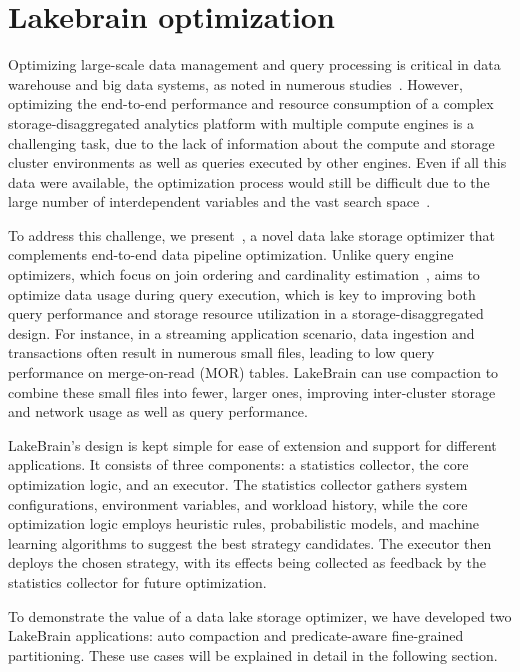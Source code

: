 \section{Lakebrain optimization} 
\label{sec:lakebrain}

Optimizing large-scale data management and query processing is critical in data warehouse and big data systems, as noted in numerous studies~\cite{}. However, optimizing the end-to-end performance and resource consumption of a complex storage-disaggregated analytics platform with multiple compute engines is a challenging task, due to the lack of information about the compute and storage cluster environments as well as queries executed by other engines. Even if all this data were available, the optimization process would still be difficult due to the large number of interdependent variables and the vast search space~\cite{}.

To address this challenge, we present~\sys, a novel data lake storage optimizer that complements end-to-end data pipeline optimization. Unlike query engine optimizers, which focus on join ordering and cardinality estimation~\cite{}, \sys aims to optimize data usage during query execution, which is key to improving both query performance and storage resource utilization in a storage-disaggregated design. For instance, in a streaming application scenario, data ingestion and transactions often result in numerous small files, leading to low query performance on merge-on-read (MOR) tables. LakeBrain can use compaction to combine these small files into fewer, larger ones, improving inter-cluster storage and network usage as well as query performance.

LakeBrain's design is kept simple for ease of extension and support for different applications. It consists of three components: a statistics collector, the core optimization logic, and an executor. The statistics collector gathers system configurations, environment variables, and workload history, while the core optimization logic employs heuristic rules, probabilistic models, and machine learning algorithms to suggest the best strategy candidates. The executor then deploys the chosen strategy, with its effects being collected as feedback by the statistics collector for future optimization.

To demonstrate the value of a data lake storage optimizer, we have developed two LakeBrain applications: auto compaction and predicate-aware fine-grained partitioning. These use cases will be explained in detail in the following section.

